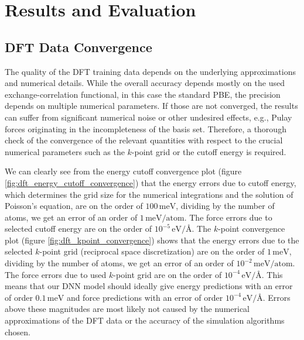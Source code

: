 \chapter{Results and Evaluation}
\label{chap:results-and-evaluation}

\section{DFT Data Convergence}

The quality of the DFT training data depends on the underlying approximations
and numerical details. While the overall accuracy depends mostly on the used
exchange-correlation functional, in this case the standard PBE, the precision
depends on multiple numerical parameters. If those are not converged, the
results can suffer from significant numerical noise or other undesired
effects, e.g., Pulay forces originating in the incompleteness of the basis
set. Therefore, a thorough check of the convergence of the relevant quantities
with respect to the crucial numerical parameters such as the $k$-point grid or
the cutoff energy is required.

We can clearly see from the energy cutoff convergence plot
(figure \ref{fig:dft_energy_cutoff_convergence}) that the energy errors due
to cutoff energy, which determines the grid size for the numerical
integrations and the solution of Poisson's equation, are on the order of
$100 \, \mathrm{meV}$, dividing by the number of atoms, we get an error of an
order of $1 \, \mathrm{meV}/\mathrm{atom}$. The force errors due to selected
cutoff energy are on the order of $10^{-5} \, \mathrm{eV}/\text{\AA}$. The
$k$-point convergence plot (figure \ref{fig:dft_kpoint_convergence}) shows
that the energy errors due to the selected $k$-point grid
(reciprocal space discretization) are on the order of $1 \, \mathrm{meV}$,
dividing by the number of atoms, we get an error of an order of
$10^{-2} \, \mathrm{meV}/\mathrm{atom}$. The force errors due to used
$k$-point grid are on the order of $10^{-4} \, \mathrm{eV}/\text{\AA}$. This
means that our DNN model should ideally give energy predictions with an error
of order $0.1 \, \mathrm{meV}$ and force predictions with an error of order
$10^{-4} \, \mathrm{eV}/\text{\AA}$. Errors above these magnitudes are
most likely not caused by the numerical approximations of the DFT data or the
accuracy of the simulation algorithms chosen.

